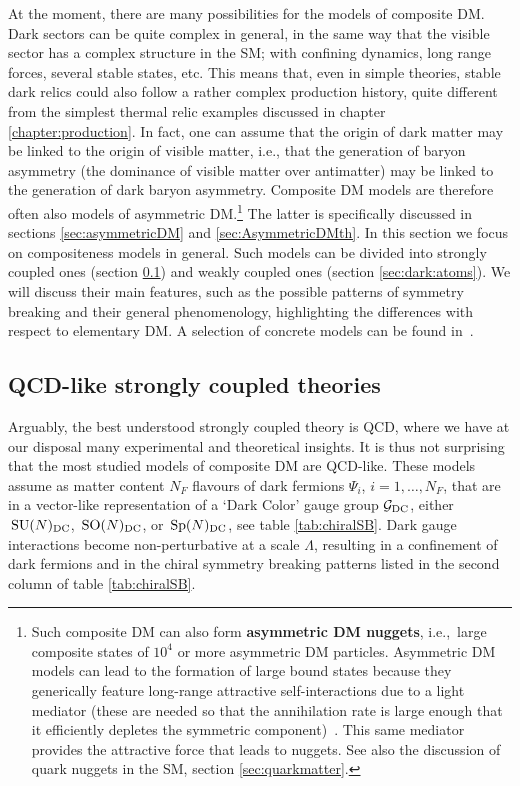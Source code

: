 \medskip

At the moment, there are many possibilities for the models of composite DM. Dark sectors can  be quite complex in general, in the same way that the visible sector has a complex structure in the SM; with confining dynamics, long range forces, several stable states, etc. This means that, even in simple theories, stable dark relics could also follow a rather complex production history, quite different from the simplest thermal relic examples discussed in chapter \ref{chapter:production}. 
In fact, one can assume that the origin of dark matter may be linked to the origin of visible matter, i.e., 
that the generation of baryon asymmetry (the dominance of visible matter over antimatter) 
may be linked to the generation of dark baryon asymmetry. 
Composite DM models 
are therefore often also models of asymmetric DM.\footnote{
Such composite DM can also form {\bf asymmetric DM nuggets}, i.e.,~large composite states of $10^4$ or more asymmetric DM particles. 
Asymmetric DM models can lead to the formation of large bound states because they generically feature long-range attractive self-interactions due to a light mediator
(these are needed so that the annihilation rate is large enough that it efficiently depletes the symmetric component)~\cite{aDMnuggets}. 
This same mediator provides the attractive force that leads to nuggets. See also the discussion of quark nuggets in the SM, section \ref{sec:quarkmatter}.}
The latter is specifically discussed in sections \ref{sec:asymmetricDM} and \ref{sec:AsymmetricDMth}. 
In this section we focus on compositeness models  in general.
Such models can be divided into strongly coupled ones (section \ref{sec:strongly:coupled:DM:theories}) 
and weakly coupled ones (section \ref{sec:dark:atoms}).
We will discuss their main features, such as the possible patterns of symmetry breaking and their general phenomenology,
highlighting the differences with respect to elementary DM. 
A selection of  concrete models can be found in~\cite{BaryonicDM}. 


\subsection{QCD-like strongly coupled theories}\label{sec:strongly:coupled:DM:theories}
Arguably, the best understood strongly coupled theory is QCD, where we have at our disposal many experimental and theoretical insights. It is thus not surprising that the most studied models of composite DM are QCD-like. 
These models assume as matter content $N_F$ flavours of 
dark fermions $\Psi_i$, $i=1,\ldots, N_F$, that are in a vector-like representation of a `Dark Color' gauge group $\mathcal{G}_{\rm DC}$, either  $\,{\rm SU}(N)_{\rm DC}$, $\,{\rm SO}(N)_{\rm DC}$, or $\,{\rm Sp}(N)_{\rm DC}$, see table \ref{tab:chiralSB}.
Dark gauge interactions become non-perturbative at a scale $\Lambda$, resulting in a
 confinement of dark fermions and in the chiral symmetry breaking patterns listed in the second column of table \ref{tab:chiralSB}.
 
